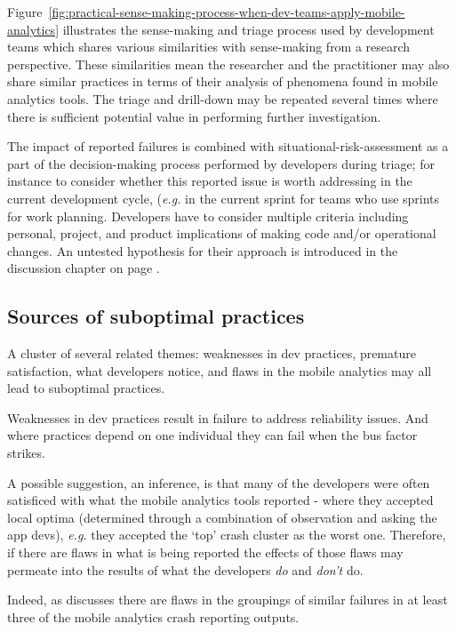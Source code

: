 Figure~\ref{fig:practical-sense-making-process-when-dev-teams-apply-mobile-analytics} illustrates the sense-making and triage process used by development teams which shares various similarities with sense-making from a research perspective. These similarities mean the researcher and the practitioner may also share similar practices in terms of their analysis of phenomena found in mobile analytics tools. The triage and drill-down may be repeated several times where there is sufficient potential value in performing further investigation. 

The impact of reported failures is combined with situational-risk-assessment as a part of the decision-making process performed by developers during triage; for instance to consider whether this reported issue is worth addressing in the current development cycle, (\textit{e.g.} in the current sprint for teams who use sprints for work planning. Developers have to consider multiple criteria including personal, project, and product implications of making code and/or operational changes. An untested hypothesis for their approach is introduced in the discussion chapter on page \pageref{discussion-decision-making-by-dev-teams-section}.

\subsection{Sources of suboptimal practices}
A cluster of several related themes: weaknesses in dev practices, premature satisfaction, what developers notice, and flaws in the mobile analytics may all lead to suboptimal practices.

Weaknesses in dev practices result in failure to address reliability issues. And where practices depend on one individual they can fail when the bus factor strikes. 

A possible suggestion, an inference, is that many of the developers were often satisficed with what the mobile analytics tools reported - where they accepted local optima (determined through a combination of observation and asking the app devs), \textit{e.g.} they accepted the `top' crash cluster as the worst one. Therefore, if there are flaws in what is being reported the effects of those flaws may permeate into the results of what the developers \textit{do} and \textit{don't} do.

Indeed, as  discusses there are flaws in the groupings of similar failures in at least three of the mobile analytics crash reporting outputs.


